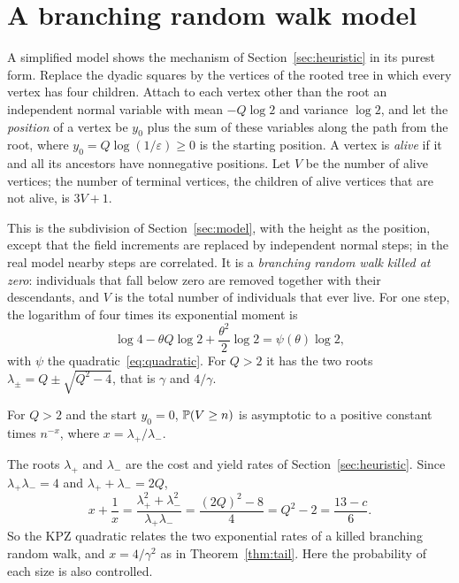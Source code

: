 \section{A branching random walk model}\label{sec:brw}

A simplified model shows the mechanism of Section~\ref{sec:heuristic} in its purest form. Replace
the dyadic squares by the vertices of the rooted tree in which every vertex has four children. Attach to each vertex
other than the root an independent normal variable with mean
$-Q\log2$ and variance $\log2$, and let the \emph{position} of a vertex be $y_0$ plus the sum of these
variables along the path from the root, where $y_0=Q\log(1/\varepsilon)\ge0$ is the starting
position. A vertex is \emph{alive} if it and all its ancestors have nonnegative positions. Let $V$
be the number of alive vertices; the number of terminal vertices, the children of alive vertices
that are not alive, is $3V+1$.

This is the subdivision of Section~\ref{sec:model}, with the height as the position, except that
the field increments are replaced by independent normal steps; in the real model nearby steps are
correlated. It is a \emph{branching random walk killed at zero}: individuals that fall below zero
are removed together with their descendants, and $V$ is the total number of individuals that ever
live. For one step, the logarithm of four times its exponential moment is
\[
\log4-\theta Q\log2+\frac{\theta^2}2\log2=\psi(\theta)\log2,
\]
with $\psi$ the quadratic~\eqref{eq:quadratic}. For $Q>2$ it has the two roots
$\lambda_\pm=Q\pm\sqrt{Q^2-4}$, that is $\gamma$ and $4/\gamma$.

\begin{theorem}\label{thm:ahz}
For $Q>2$ and the start $y_0=0$, $\mathbb{P}(V\ge n)$ is asymptotic to a positive constant times
$n^{-x}$, where $x=\lambda_+/\lambda_-$.
\end{theorem}

The roots $\lambda_+$ and $\lambda_-$ are the cost and yield rates of Section~\ref{sec:heuristic}. Since $\lambda_+\lambda_-=4$ and $\lambda_++\lambda_-=2Q$,
\[
x+\frac1x=\frac{\lambda_+^2+\lambda_-^2}{\lambda_+\lambda_-}=\frac{(2Q)^2-8}{4}=Q^2-2=\frac{13-c}6 .
\]
So the KPZ quadratic relates the two exponential rates of a killed branching random walk, and
$x=4/\gamma^2$ as in Theorem~\ref{thm:tail}. Here the probability of each size is also controlled.

